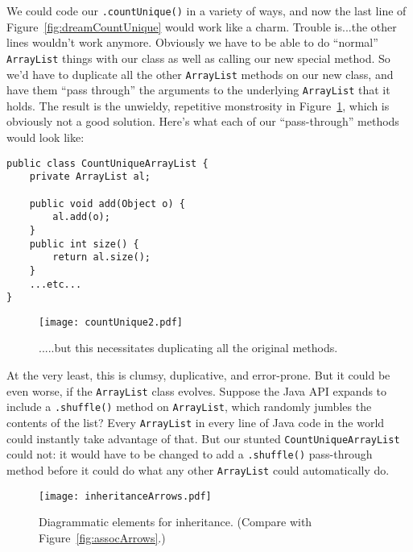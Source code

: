 We could code our \texttt{.countUnique()} in a variety of ways, and now the
last line of Figure~\ref{fig:dreamCountUnique} would work like a charm.
Trouble is...the other lines wouldn't work anymore. Obviously we have to be
able to do ``normal'' \texttt{ArrayList} things with our class as well as
calling our new special method. So we'd have to duplicate all the other
\texttt{ArrayList} methods on our new class, and have them ``pass through'' the
arguments to the underlying \texttt{ArrayList} that it holds. The result is
the unwieldy, repetitive monstrosity in Figure~\ref{fig:countUnique2}, which
is obviously not a good solution. Here's what each of our ``pass-through''
methods would look like:

\begin{Verbatim}[fontsize=\small,samepage=true,frame=single]
public class CountUniqueArrayList {
    private ArrayList al;

    public void add(Object o) {
        al.add(o);
    }
    public int size() {
        return al.size();
    }
    ...etc...
}\end{Verbatim}


\begin{figure}
\centering
\texttt{[image: countUnique2.pdf]}  %
\caption{.....but this necessitates duplicating all the original methods.}
\label{fig:countUnique2}
\end{figure}

At the very least, this is clumsy, duplicative, and error-prone. But it could
be even worse, if the \texttt{ArrayList} class evolves. Suppose the Java API
expands to include a \texttt{.shuffle()} method on \texttt{ArrayList}, which
randomly jumbles the contents of the list? Every \texttt{ArrayList} in every
line of Java code in the world could instantly take advantage of that. But our
stunted \texttt{CountUniqueArrayList} could not: it would have to be changed
to add a \texttt{.shuffle()} pass-through method before it could do what any
other \texttt{ArrayList} could automatically do.

\label{page:inheritanceArrows}
\begin{figure}[h]
\centering
\texttt{[image: inheritanceArrows.pdf]}
\caption{Diagrammatic elements for inheritance. (Compare with
Figure~\ref{fig:assocArrows}.)}
\label{fig:inheritanceArrows}
\end{figure}

